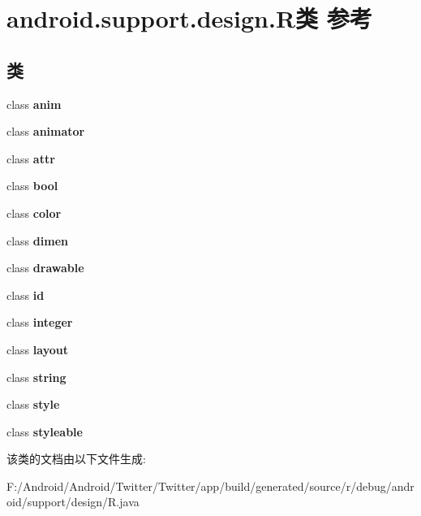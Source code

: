 \hypertarget{classandroid_1_1support_1_1design_1_1_r}{}\section{android.\+support.\+design.\+R类 参考}
\label{classandroid_1_1support_1_1design_1_1_r}
\subsection*{类}
\begin{DoxyCompactItemize}
\item 
class {\bfseries anim}
\item 
class {\bfseries animator}
\item 
class {\bfseries attr}
\item 
class {\bfseries bool}
\item 
class {\bfseries color}
\item 
class {\bfseries dimen}
\item 
class {\bfseries drawable}
\item 
class {\bfseries id}
\item 
class {\bfseries integer}
\item 
class {\bfseries layout}
\item 
class {\bfseries string}
\item 
class {\bfseries style}
\item 
class {\bfseries styleable}
\end{DoxyCompactItemize}


该类的文档由以下文件生成\+:\begin{DoxyCompactItemize}
\item 
F\+:/\+Android/\+Android/\+Twitter/\+Twitter/app/build/generated/source/r/debug/android/support/design/R.\+java\end{DoxyCompactItemize}
